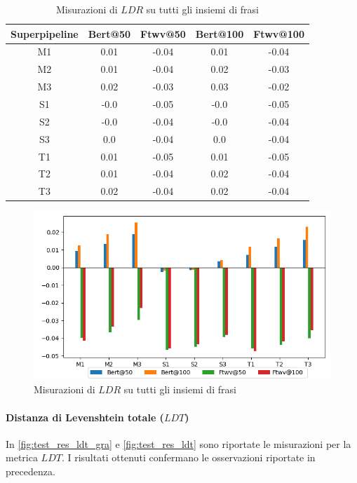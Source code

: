 \begin{table}[H]
\centering
\begin{tabular}{c|cc|cc}
\textbf{Superpipeline} & \textbf{Bert@50} &  \textbf{Ftwv@50} & \textbf{Bert@100} & \textbf{Ftwv@100}\\
\hline
M1& 0.01& -0.04& 0.01& -0.04\\
M2& 0.01& -0.04& 0.02& -0.03\\
M3& 0.02& -0.03& 0.03& -0.02\\
S1& -0.0& -0.05& -0.0& -0.05\\
S2& -0.0& -0.04& -0.0& -0.04\\
S3& 0.0& -0.04& 0.0& -0.04\\
T1& 0.01& -0.05& 0.01& -0.05\\
T2& 0.01& -0.04& 0.02& -0.04\\
T3& 0.02& -0.04& 0.02& -0.04\\
\end{tabular}
\caption{Misurazioni di $LDR$ su tutti gli insiemi di frasi}
\label{fig:test_res_ldr_gra}
\end{table}

\begin{figure}[H]
\centering
\includegraphics[width=\textwidth]{immagini/test/ldr}
\caption{Misurazioni di $LDR$ su tutti gli insiemi di frasi}
\label{fig:test_res_ldr}
\end{figure}
\vfill

\paragraph{Distanza di Levenshtein totale ($LDT$)}
In \autoref{fig:test_res_ldt_gra} e \autoref{fig:test_res_ldt} sono riportate le misurazioni per la metrica $LDT$. I risultati ottenuti confermano le osservazioni riportate in precedenza.

